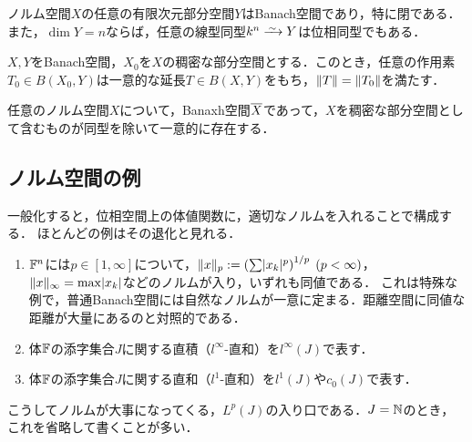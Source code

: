 \documentclass[uplatex,dvipdfmx]{jsreport}
\begin{document}
\begin{proposition}[自明なBanach部分空間]\label{prop-finite-subspaces}
    ノルム空間$X$の任意の有限次元部分空間$Y$はBanach空間であり，特に閉である．
    また，$\dim Y=n$ならば，任意の線型同型$k^n\iso Y$は位相同型でもある．
\end{proposition}

\begin{proposition}\label{prop-extension-of-operator-on-dense-subset}
    $X,Y$をBanach空間，$X_0$を$X$の稠密な部分空間とする．このとき，任意の作用素$T_0\in B(X_0,Y)$は一意的な延長$T\in B(X,Y)$をもち，$\|T\|=\|T_0\|$を満たす．
\end{proposition}

\begin{proposition}
    任意のノルム空間$X$について，Banaxh空間$\overline{X}$であって，$X$を稠密な部分空間として含むものが同型を除いて一意的に存在する．
\end{proposition}

\subsection{ノルム空間の例}

\begin{tcolorbox}[colframe=ForestGreen, colback=ForestGreen!10!white,breakable,colbacktitle=ForestGreen!40!white,coltitle=black,fonttitle=\bfseries\sffamily,
title=]
    一般化すると，位相空間上の体値関数に，適切なノルムを入れることで構成する．
    ほとんどの例はその退化と見れる．
\end{tcolorbox}

\begin{example}[体の積]\mbox{}
    \begin{enumerate}
        \item $\mathbb{F}^n$には$p\in[1,\infty]$について，$\|x\|_p:=\left(\sum\lvert x_k\rvert^p\right)^{1/p}\;(p<\infty)$，$\|x\|_\infty=\max\lvert x_k\rvert$などのノルムが入り，いずれも同値である．
        これは特殊な例で，普通Banach空間には自然なノルムが一意に定まる．距離空間に同値な距離が大量にあるのと対照的である．
        \item 体$\mathbb{F}$の添字集合$J$に関する直積（$l^\infty$-直和）を$l^\infty(J)$で表す．
        \item 体$\mathbb{F}$の添字集合$J$に関する直和（$l^1$-直和）を$l^1(J)$や$c_0(J)$で表す．
    \end{enumerate}
    こうしてノルムが大事になってくる，$L^p(J)$の入り口である．$J=\mathbb{N}$のとき，これを省略して書くことが多い．
\end{example}
\end{document}
